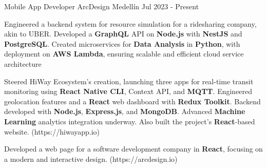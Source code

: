 
\begin{cventries}
  \cventry
  {Mobile App Developer} %
  {ArcDesign} %
  {Medellín} %
  {Jul 2023 - Present} %
  {
    \begin{cvitems} %
      \item {Engineered a backend system for resource simulation for a ridesharing company, akin to UBER. Developed a \textbf{GraphQL} API on \textbf{Node.js}
      with \textbf{NestJS} and \textbf{PostgreSQL}. Created microservices for \textbf{Data Analysis}
      in \textbf{Python}, with deployment on \textbf{AWS Lambda}, ensuring scalable and
      efficient cloud service architecture}
      \item {Steered HiWay Ecosystem's creation, launching three apps for real-time transit monitoring using \textbf{React Native CLI}, Context API, and \textbf{MQTT}. Engineered geolocation features and a \textbf{React} web dashboard with \textbf{Redux Toolkit}. Backend developed with \textbf{Node.js}, \textbf{Express.js}, and \textbf{MongoDB}. Advanced \textbf{Machine Learning} analytics integration underway. Also built the project's \textbf{React}-based website. (https://hiwayapp.io)}
      \item {Developed a web page for a software development company in
      \textbf{React}, focusing on a modern and interactive design. (https://arcdesign.io)}
    \end{cvitems}
  }
\end{cventries}